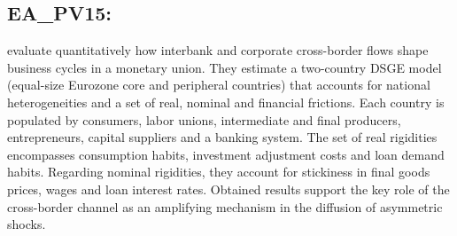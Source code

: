 \documentclass[11pt,a4paper]{article}
\begin{document}
	\subsection{EA\_PV15: \cite{poutineau2015cross}}
	\label{EAPV15}
	\cite{poutineau2015cross} evaluate quantitatively how interbank and corporate cross-border flows shape business cycles in a monetary union. They estimate a two-country DSGE model (equal-size Eurozone core and peripheral countries) that accounts for national heterogeneities and a set of real, nominal and financial frictions. Each country is populated by consumers, labor unions, intermediate and final producers, entrepreneurs, capital suppliers and a banking system. The set of real rigidities encompasses consumption habits, investment adjustment costs and loan demand habits. Regarding nominal rigidities, they account for stickiness in final goods prices, wages and loan interest rates. Obtained results support the key role of the cross-border channel as an amplifying mechanism in the diffusion of asymmetric shocks.
\end{document}
